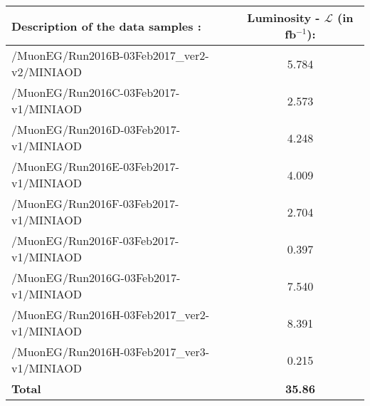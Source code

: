 \begin{tabular}{|l|c|}
\hline
Description of the data samples : & Luminosity - $\mathcal{L}$  (in  fb$^{-1}$): \\ \hline
\small{/MuonEG/Run2016B-03Feb2017\_ver2-v2/MINIAOD} & 5.784 \\ \hline
\small{/MuonEG/Run2016C-03Feb2017-v1/MINIAOD} & 2.573 \\ \hline
\small{/MuonEG/Run2016D-03Feb2017-v1/MINIAOD} & 4.248 \\ \hline
\small{/MuonEG/Run2016E-03Feb2017-v1/MINIAOD} & 4.009 \\ \hline
\small{/MuonEG/Run2016F-03Feb2017-v1/MINIAOD} & 2.704 \\ \hline
\small{/MuonEG/Run2016F-03Feb2017-v1/MINIAOD} & 0.397 \\ \hline
\small{/MuonEG/Run2016G-03Feb2017-v1/MINIAOD} & 7.540 \\ \hline
\small{/MuonEG/Run2016H-03Feb2017\_ver2-v1/MINIAOD} & 8.391 \\ \hline
\small{/MuonEG/Run2016H-03Feb2017\_ver3-v1/MINIAOD} & 0.215 \\ \hline
\textbf{Total} & \textbf{35.86}  \\ \hline

\end{tabular}

